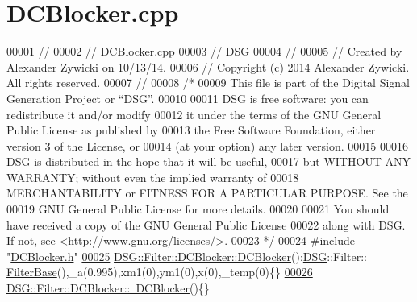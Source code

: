 \hypertarget{_d_c_blocker_8cpp_source}{\section{D\+C\+Blocker.\+cpp}
\label{_d_c_blocker_8cpp_source}
}

\begin{DoxyCode}
00001 \textcolor{comment}{//}
00002 \textcolor{comment}{//  DCBlocker.cpp}
00003 \textcolor{comment}{//  DSG}
00004 \textcolor{comment}{//}
00005 \textcolor{comment}{//  Created by Alexander Zywicki on 10/13/14.}
00006 \textcolor{comment}{//  Copyright (c) 2014 Alexander Zywicki. All rights reserved.}
00007 \textcolor{comment}{//}
00008 \textcolor{comment}{/*}
00009 \textcolor{comment}{ This file is part of the Digital Signal Generation Project or “DSG”.}
00010 \textcolor{comment}{}
00011 \textcolor{comment}{ DSG is free software: you can redistribute it and/or modify}
00012 \textcolor{comment}{ it under the terms of the GNU General Public License as published by}
00013 \textcolor{comment}{ the Free Software Foundation, either version 3 of the License, or}
00014 \textcolor{comment}{ (at your option) any later version.}
00015 \textcolor{comment}{}
00016 \textcolor{comment}{ DSG is distributed in the hope that it will be useful,}
00017 \textcolor{comment}{ but WITHOUT ANY WARRANTY; without even the implied warranty of}
00018 \textcolor{comment}{ MERCHANTABILITY or FITNESS FOR A PARTICULAR PURPOSE.  See the}
00019 \textcolor{comment}{ GNU General Public License for more details.}
00020 \textcolor{comment}{}
00021 \textcolor{comment}{ You should have received a copy of the GNU General Public License}
00022 \textcolor{comment}{ along with DSG.  If not, see <http://www.gnu.org/licenses/>.}
00023 \textcolor{comment}{ */}
00024 \textcolor{preprocessor}{#include "\hyperlink{_d_c_blocker_8h}{DCBlocker.h}"}
\hypertarget{_d_c_blocker_8cpp_source_l00025}{}\hyperlink{class_d_s_g_1_1_filter_1_1_d_c_blocker_a71cb7abe6fca10f64402971d8b4a6eb3}{00025} \hyperlink{class_d_s_g_1_1_filter_1_1_d_c_blocker_a71cb7abe6fca10f64402971d8b4a6eb3}{DSG::Filter::DCBlocker::DCBlocker}():\hyperlink{namespace_d_s_g}{DSG}::Filter::
      \hyperlink{class_d_s_g_1_1_filter_1_1_filter_base}{FilterBase}(),\_a(0.995),xm1(0),ym1(0),x(0),\_temp(0)\{\}
\hypertarget{_d_c_blocker_8cpp_source_l00026}{}\hyperlink{class_d_s_g_1_1_filter_1_1_d_c_blocker_a5393dac29a226f5912f6d1705b69eecf}{00026} \hyperlink{class_d_s_g_1_1_filter_1_1_d_c_blocker_a5393dac29a226f5912f6d1705b69eecf}{DSG::Filter::DCBlocker::~DCBlocker}()\{\}
\end{DoxyCode}
